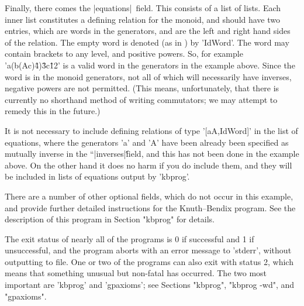 Finally, there comes the |equations|\ field. This consists of a list of
lists. Each inner list constitutes a defining relation for the
monoid, and should have two entries, which are words in the generators,
and are the left and right hand sides of the relation.
The empty word is denoted (as in {\GAP}) by 'IdWord'.
The word may contain brackets to any level, and positive powers.
So, for example 'a\*(b\*(A\*c)\^4)\^3\*c\^12' is a valid word in the generators
in the example above.
Since the word is in the monoid generators, not all of which will
necessarily have inverses, negative powers are not permitted. (This means,
unfortunately, that there is currently no shorthand method of writing
commutators; we may attempt to remedy this in the future.)

It is not necessary to include defining relations of type
'[a\*A,IdWord]' in the list of equations, where the generators 'a' and 'A'
have been already been specified as mutually inverse in the ``|inverses|\'\'
field, and this has not been done in the example above. On the other hand
it does no harm if you do include them, and they will be included in
lists of equations output by 'kbprog'.

There are a number of other optional fields, which do not occur in this example,
and provide further detailed instructions for the Knuth--Bendix program.
See the description of this program in Section "kbprog" for details.


The exit status of nearly all of the programs is 0 if successful and
1 if unsuccessful, and the program aborts with an error message
to 'stderr', without outputting to file.
One or two of the programs can also exit with status 2, which means that
something unusual but non-fatal has occurred. The two most important are
'kbprog' and 'gpaxioms'; see Sections "kbprog", "kbprog -wd", and
"gpaxioms".

